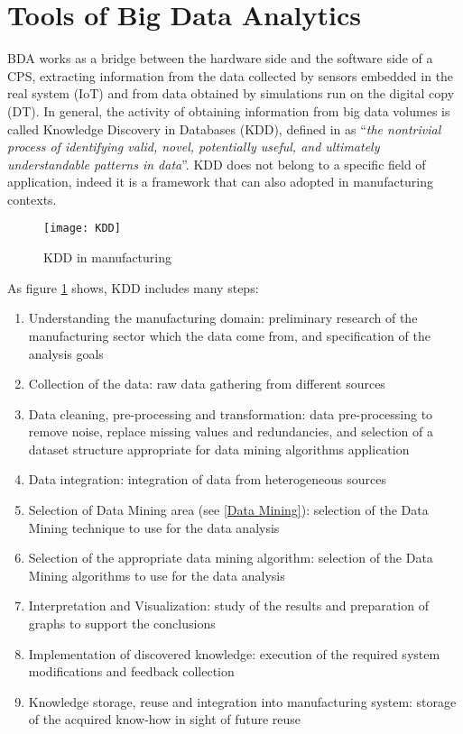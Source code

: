 \section{Tools of Big Data Analytics}
BDA works as a bridge between the hardware side and the software side of a CPS, extracting information from the data collected by sensors embedded in the real system (IoT) and from data obtained by simulations run on the digital copy (DT). In general, the activity of obtaining information from big data volumes is called Knowledge Discovery in Databases (KDD), defined in \cite{ChoudharyAlokK.2009Dmim} as “\textit{the nontrivial process of identifying valid, novel, potentially useful, and ultimately understandable patterns in data}”. KDD does not belong to a specific field of application, indeed it is a framework that can also adopted in manufacturing contexts. 
\begin{figure}[h] 
\centering    
\texttt{[image: KDD]}
\caption{KDD in manufacturing \cite{ChoudharyAlokK.2009Dmim}}
\label{fig:KDD in manufacturing}
\end{figure} 
As figure \ref{fig:KDD in manufacturing} shows, KDD includes many steps: 
\begin{enumerate}
\item Understanding the manufacturing domain: preliminary research of the manufacturing sector which the data come from, and specification of the analysis goals
\item Collection of the data: raw data gathering from different sources
\item Data cleaning, pre-processing and transformation: data pre-processing to remove noise, replace missing values and redundancies, and selection of a dataset structure appropriate for data mining algorithms application 
\item Data integration: integration of data from heterogeneous sources
\item Selection of Data Mining area (see \ref{Data Mining}): selection of the Data Mining technique to use for the data analysis
\item Selection of the appropriate data mining algorithm: selection of the Data Mining algorithms to use for the data analysis
\item Interpretation and Visualization: study of the results and preparation of graphs to support the conclusions
\item Implementation of discovered knowledge: execution of the required system modifications and feedback collection 
\item Knowledge storage, reuse and integration into manufacturing system: storage of the acquired know-how in sight of future reuse
\end{enumerate}

